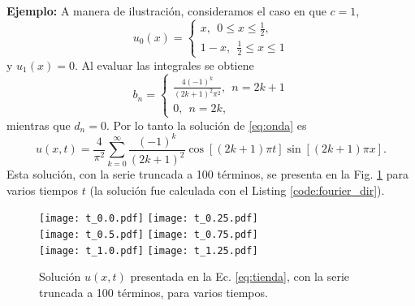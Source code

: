 \documentclass[11pt]{article}
\begin{document}
{\bf Ejemplo:} A manera de ilustraci\'on, consideramos el caso en que $c=1$,
\begin{equation}
  \label{eq:9}
  u_0(x) =
  \begin{cases}
    x,~~ 0 \le x \le \frac{1}{2}, \\
    1-x,~~ \frac{1}{2} \le x \le 1
  \end{cases}
\end{equation}
y $u_1(x) = 0$.
Al evaluar las integrales se obtiene
\begin{equation}
  \label{eq:10}
  b_n =
  \begin{cases}
    \frac{4(-1)^k}{(2k+1)^2\pi^2},~~n=2k+1 \\
    0,~~n=2k,
  \end{cases}
\end{equation}
mientras que $d_n=0$.
Por lo tanto la soluci\'on de \eqref{eq:onda} es
\begin{equation}
  \label{eq:tienda}
  u(x,t) = \frac{4}{\pi^2} \sum_{k=0}^\infty \frac{(-1)^k}{(2k+1)^2} \cos[(2k+1)\pi t] \sin[(2k+1)\pi x].
\end{equation}
Esta soluci\'on, con la serie truncada a 100 t\'erminos, se presenta en la Fig. \ref{fig:tienda} para varios tiempos $t$ (la soluci\'on fue calculada con el Listing \ref{code:fourier_dir}).
\begin{figure}[h]
  \centering
  \texttt{[image: t\_0.0.pdf]} 
  \texttt{[image: t\_0.25.pdf]} \\
  \texttt{[image: t\_0.5.pdf]} 
  \texttt{[image: t\_0.75.pdf]} \\
  \texttt{[image: t\_1.0.pdf]}
  \texttt{[image: t\_1.25.pdf]}
  \caption{Soluci\'on $u(x,t)$ presentada en la Ec. \eqref{eq:tienda}, con la serie truncada a 100 t\'erminos, para varios tiempos.}
  \label{fig:tienda}
\end{figure}


\end{document}
